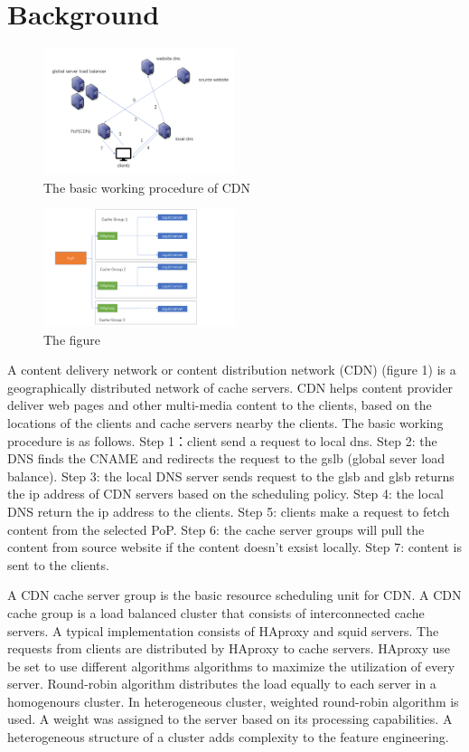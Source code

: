 \documentclass[5p]{elsarticle}
\begin{document}
\section{Background}
\begin{figure}[h]
    \centering
    \includegraphics[width=0.5\textwidth]{CDN_new.png}
    \caption{The basic working procedure of CDN}
    \label{fig}
\end{figure}

\begin{figure}[h]
    \centering
    \includegraphics[width=0.5\textwidth]{cache_group.png}
    \caption{The figure}
    \label{fig: the structure of PoP}
\end{figure}

A content delivery network or content distribution network (CDN) (figure 1) is a geographically distributed network of cache servers. CDN helps content provider deliver web pages and other multi-media content to the clients, based on the locations of the clients and cache servers nearby the clients. The basic working procedure is as follows. Step 1：client send a request to local dns. Step 2: the DNS finds the CNAME and redirects the request to the gslb (global sever load balance). Step 3: the local DNS server sends request to the glsb and glsb returns the ip address of CDN servers based on the scheduling policy. Step 4: the local DNS return the ip address to the clients. Step 5: clients make a request to fetch content from the selected PoP. Step 6: the cache server groups will pull the content from source website if the content doesn't exsist locally. Step 7: content is sent to the clients.

A CDN cache server group is the basic resource scheduling unit for CDN. A CDN cache group is a load balanced cluster that consists of interconnected cache servers. A typical implementation consists of HAproxy and squid servers. The requests from clients are distributed by HAproxy to cache servers. HAproxy use be set to use different algorithms algorithms to maximize the utilization of every server. Round-robin algorithm distributes the load equally to each server in a homogenours cluster. In heterogeneous cluster, weighted round-robin algorithm is used. A weight was assigned to the server based on its processing capabilities. A heterogeneous structure of a cluster adds complexity to the feature engineering.
\end{document}
